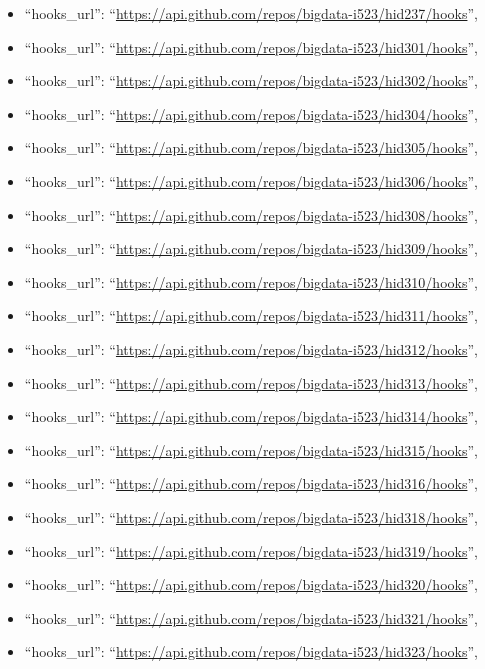 \begin{itemize}
\item
  ``hooks\_url'':
  ``\url{https://api.github.com/repos/bigdata-i523/hid237/hooks}'',
\item
  ``hooks\_url'':
  ``\url{https://api.github.com/repos/bigdata-i523/hid301/hooks}'',
\item
  ``hooks\_url'':
  ``\url{https://api.github.com/repos/bigdata-i523/hid302/hooks}'',
\item
  ``hooks\_url'':
  ``\url{https://api.github.com/repos/bigdata-i523/hid304/hooks}'',
\item
  ``hooks\_url'':
  ``\url{https://api.github.com/repos/bigdata-i523/hid305/hooks}'',
\item
  ``hooks\_url'':
  ``\url{https://api.github.com/repos/bigdata-i523/hid306/hooks}'',
\item
  ``hooks\_url'':
  ``\url{https://api.github.com/repos/bigdata-i523/hid308/hooks}'',
\item
  ``hooks\_url'':
  ``\url{https://api.github.com/repos/bigdata-i523/hid309/hooks}'',
\item
  ``hooks\_url'':
  ``\url{https://api.github.com/repos/bigdata-i523/hid310/hooks}'',
\item
  ``hooks\_url'':
  ``\url{https://api.github.com/repos/bigdata-i523/hid311/hooks}'',
\item
  ``hooks\_url'':
  ``\url{https://api.github.com/repos/bigdata-i523/hid312/hooks}'',
\item
  ``hooks\_url'':
  ``\url{https://api.github.com/repos/bigdata-i523/hid313/hooks}'',
\item
  ``hooks\_url'':
  ``\url{https://api.github.com/repos/bigdata-i523/hid314/hooks}'',
\item
  ``hooks\_url'':
  ``\url{https://api.github.com/repos/bigdata-i523/hid315/hooks}'',
\item
  ``hooks\_url'':
  ``\url{https://api.github.com/repos/bigdata-i523/hid316/hooks}'',
\item
  ``hooks\_url'':
  ``\url{https://api.github.com/repos/bigdata-i523/hid318/hooks}'',
\item
  ``hooks\_url'':
  ``\url{https://api.github.com/repos/bigdata-i523/hid319/hooks}'',
\item
  ``hooks\_url'':
  ``\url{https://api.github.com/repos/bigdata-i523/hid320/hooks}'',
\item
  ``hooks\_url'':
  ``\url{https://api.github.com/repos/bigdata-i523/hid321/hooks}'',
\item
  ``hooks\_url'':
  ``\url{https://api.github.com/repos/bigdata-i523/hid323/hooks}'',

\end{itemize}
